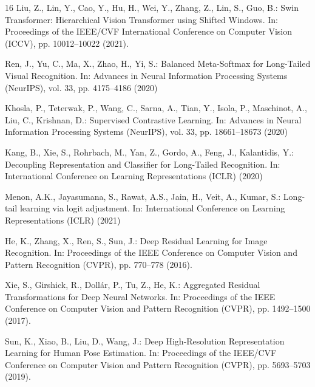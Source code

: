 \documentclass[runningheads]{llncs}
\begin{document}
\begin{thebibliography}{16}
Liu, Z., Lin, Y., Cao, Y., Hu, H., Wei, Y., Zhang, Z., Lin, S., Guo, B.: Swin Transformer: Hierarchical Vision Transformer using Shifted Windows. In: Proceedings of the IEEE/CVF International Conference on Computer Vision (ICCV), pp. 10012--10022 (2021). 

Ren, J., Yu, C., Ma, X., Zhao, H., Yi, S.: Balanced Meta-Softmax for Long-Tailed Visual Recognition. In: Advances in Neural Information Processing Systems (NeurIPS), vol. 33, pp. 4175--4186 (2020)

Khosla, P., Teterwak, P., Wang, C., Sarna, A., Tian, Y., Isola, P., Maschinot, A., Liu, C., Krishnan, D.: Supervised Contrastive Learning. In: Advances in Neural Information Processing Systems (NeurIPS), vol. 33, pp. 18661--18673 (2020)

Kang, B., Xie, S., Rohrbach, M., Yan, Z., Gordo, A., Feng, J., Kalantidis, Y.: Decoupling Representation and Classifier for Long-Tailed Recognition. In: International Conference on Learning Representations (ICLR) (2020)

Menon, A.K., Jayasumana, S., Rawat, A.S., Jain, H., Veit, A., Kumar, S.: Long-tail learning via logit adjustment. In: International Conference on Learning Representations (ICLR) (2021)

He, K., Zhang, X., Ren, S., Sun, J.: Deep Residual Learning for Image Recognition. In: Proceedings of the IEEE Conference on Computer Vision and Pattern Recognition (CVPR), pp. 770--778 (2016). 

Xie, S., Girshick, R., Dollár, P., Tu, Z., He, K.: Aggregated Residual Transformations for Deep Neural Networks. In: Proceedings of the IEEE Conference on Computer Vision and Pattern Recognition (CVPR), pp. 1492--1500 (2017). 

Sun, K., Xiao, B., Liu, D., Wang, J.: Deep High-Resolution Representation Learning for Human Pose Estimation. In: Proceedings of the IEEE/CVF Conference on Computer Vision and Pattern Recognition (CVPR), pp. 5693--5703 (2019). 

\end{thebibliography}
\end{document}
